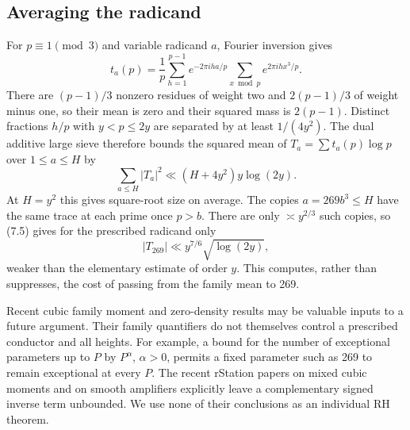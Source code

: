 \documentclass[11pt]{article}
\begin{document}
\subsection{Averaging the radicand}
For $p\equiv1\pmod3$ and variable radicand $a$, Fourier inversion gives
\[
 t_a(p)=\frac1p\sum_{h=1}^{p-1}e^{-2\pi iha/p}
                    \sum_{x\bmod p}e^{2\pi ihx^3/p}.
\]
There are $(p-1)/3$ nonzero residues of weight two and $2(p-1)/3$ of weight minus one, so their mean is zero and their squared mass is $2(p-1)$. Distinct fractions $h/p$ with $y<p\le2y$ are separated by at least $1/(4y^2)$. The dual additive large sieve therefore bounds the squared mean of $T_a=\sum t_a(p)\log p$ over $1\le a\le H$ by
\[
 \sum_{a\le H}|T_a|^2\ll(H+4y^2)y\log(2y).
 \tag{7.5}
\]
At $H=y^2$ this gives square-root size on average. The copies $a=269b^3\le H$ have the same trace at each prime once $p>b$. There are only $\asymp y^{2/3}$ such copies, so (7.5) gives for the prescribed radicand only
\[
 |T_{269}|\ll y^{7/6}\sqrt{\log(2y)},
 \tag{7.6}
\]
weaker than the elementary estimate of order $y$. This computes, rather than suppresses, the cost of passing from the family mean to 269.

Recent cubic family moment and zero-density results may be valuable inputs to a future argument. Their family quantifiers do not themselves control a prescribed conductor and all heights. For example, a bound for the number of exceptional parameters up to $P$ by $P^\alpha$, $\alpha>0$, permits a fixed parameter such as 269 to remain exceptional at every $P$. The recent rStation papers on mixed cubic moments and on smooth amplifiers explicitly leave a complementary signed inverse term unbounded. We use none of their conclusions as an individual RH theorem.
\end{document}
